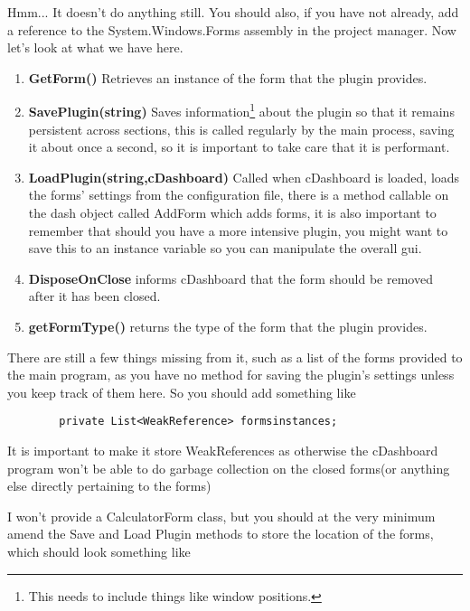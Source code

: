 \documentclass{article}
\begin{document}
 Hmm... It doesn't do anything still. You should also, if you have not already, add a reference to the System.Windows.Forms assembly in the project manager. Now let's look at what we have here.
 \begin{enumerate}
 \item \textbf{GetForm() } Retrieves an instance of the form that the plugin provides.
 \item \textbf{SavePlugin(string)} Saves information\footnote{ This needs to include things like window positions.} about the plugin so that it remains persistent across sections, this is called regularly by the main process, saving it about once a second, so it is important to take care that it is performant.
 \item \textbf{LoadPlugin(string,cDashboard)} Called when cDashboard is loaded, loads the forms' settings from the configuration file, there is a method callable on the dash object called AddForm which adds forms, it is also important to remember that should you have a more intensive plugin, you might want to save this to an instance variable so you can manipulate the overall gui.
 \item \textbf{DisposeOnClose} informs cDashboard that the form should be removed after it has been closed. 
 \item \textbf{getFormType()} returns the type of the form that the plugin provides.
 \end{enumerate}
 
 There are still a few things missing from it, such as a list of the forms provided to the main program, as you have no method for saving the plugin's settings unless you keep track of them here. So you should add something like 
 \begin{lstlisting}
 		private List<WeakReference> formsinstances;
 \end{lstlisting}
 
 It is important to make it store WeakReferences as otherwise the cDashboard program won't be able to do garbage collection on the closed forms(or anything else directly pertaining to the forms)
 
 I won't provide a CalculatorForm class, but you should at the very minimum amend the Save and Load Plugin methods to store the location of the forms, which should look something like
 
\end{document}

